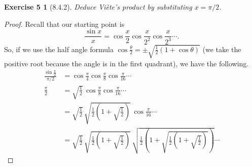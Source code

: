 \documentclass[12pt]{article}
\theoremstyle{plain}
\newtheorem*{ex5}{Exercise 5}
\begin{document}
\begin{ex5} [8.4.2]
  Deduce Vi\`{e}te’s product by substituting $x=\pi/2$.
\end{ex5}

\begin{proof}
  Recall that our starting point is
  \[
    \frac{\sin x}{x}=\cos\frac{x}{2}\cos\frac{x}{2^2}\cos\frac{x}{2^3}\cdots.
  \]
  So, if we use the half angle formula $\cos\frac{\theta}{2}=\pm\sqrt{\frac{1}{2}(1+\cos\theta)}$ (we take the positive root because the angle is in the first quadrant), we have the following.
  \begin{align*}
    \frac{\sin\frac{\pi}{2}}{\pi/2} &= \cos\frac{\pi}{4}\cos\frac{\pi}{8}\cos\frac{\pi}{16}\cdots \\
    \frac{\pi}{2}                   &= \sqrt{\frac{1}{2}}\,\cos\frac{\pi}{8}\cos\frac{\pi}{16}\cdots \\
                                    &= \sqrt{\frac{1}{2}}\,\sqrt{\frac{1}{2}\left(1+\sqrt{\frac{1}{2}}\right)}\,\cos\frac{\pi}{16}\cdots \\
                                    &= \sqrt{\frac{1}{2}}\,\sqrt{\frac{1}{2}\left(1+\sqrt{\frac{1}{2}}\right)}\,\sqrt{\frac{1}{2}\left(1+\sqrt{\frac{1}{2}\left(1+\sqrt{\frac{1}{2}}\right)}\right)}\cdots
  \end{align*}
\end{proof}
\end{document}

